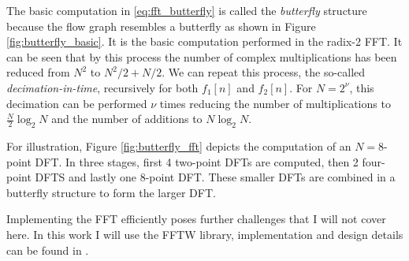 

The basic computation in \ref{eq:fft_butterfly} is called the \textit{butterfly} structure because the flow graph resembles a butterfly as shown in Figure \ref{fig:butterfly_basic}.
It is the basic computation performed in the radix-2 FFT. It can be seen that by this process the number of complex multiplications has been reduced from $N^2$ to $N^2/2+N/2$. We can repeat this process, the so-called 
\textit{decimation-in-time}, recursively for both $f_1[n]$ and $f_2[n]$. For $N=2^{\nu}$, this decimation can be performed $\nu$ times reducing the number of multiplications to 
$\frac{N}{2}\log_2 N$ and the number of additions to $N \log_2 N$.

For illustration, Figure \ref{fig:butterfly_fft} depicts the computation of an $N=8$-point DFT. In three stages, first 4 two-point DFTs are computed, then 2 four-point DFTS and 
lastly one 8-point DFT. These smaller DFTs are combined in a butterfly structure to form the larger DFT.



Implementing the FFT efficiently poses further challenges that I will not cover here. In this work I will use the FFTW library, implementation and design details
can be found in \cite{FFTW.jl-2005}.

